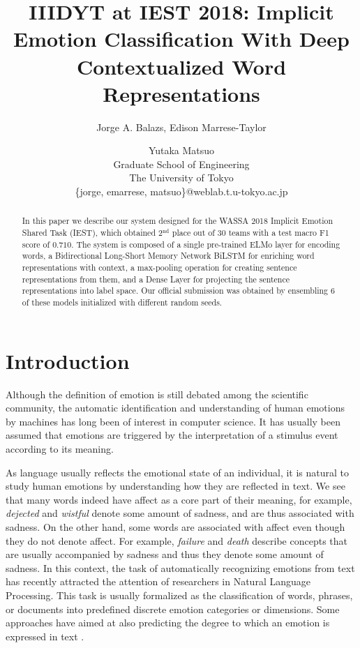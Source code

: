 \documentclass[11pt,a4paper]{article}
\title{IIIDYT at IEST 2018: Implicit Emotion Classification With Deep
Contextualized Word Representations}
\author{Jorge A. Balazs, Edison Marrese-Taylor \and Yutaka Matsuo \\
  Graduate School of Engineering\\
  The University of Tokyo\\
  \{jorge, emarrese, matsuo\}@weblab.t.u-tokyo.ac.jp \\
}
\date{}
\begin{document}
\maketitle
\begin{abstract}

In this paper we describe our system designed for the WASSA 2018 Implicit
Emotion Shared Task (IEST), which obtained 2$^{\text{nd}}$ place out of 30 teams
with a test macro F1 score of $0.710$. The system is composed of a single
pre-trained ELMo layer for encoding words, a Bidirectional Long-Short Memory
Network BiLSTM for enriching word representations with context, a max-pooling
operation for creating sentence representations from them, and a
Dense Layer for projecting the sentence representations into label space. Our
official submission was obtained by ensembling 6 of these models initialized
with different random seeds.

\end{abstract}

\section{Introduction}

Although the definition of emotion is still debated among the scientific
community, the automatic identification and understanding of human emotions by
machines has long been of interest in computer science. It has usually been
assumed that emotions are triggered by the interpretation of a stimulus event
according to its meaning. 

As language usually reflects the emotional state of an individual, it is natural
to study human emotions by understanding how they are reflected in text. We see
that many words indeed have affect as a core part of their meaning, for example,
\textit{dejected} and \textit{wistful} denote some amount of sadness, and are
thus associated with sadness. On the other hand, some words are associated with
affect even though they do not denote affect. For example, \textit{failure} and
\textit{death} describe concepts that are usually accompanied by sadness and
thus they denote some amount of sadness. In this context, the task of
automatically recognizing emotions from text has recently attracted the
attention of researchers in Natural Language Processing. This task is usually
formalized as the classification of words, phrases, or documents into predefined
discrete emotion categories or dimensions. Some approaches have aimed at also
predicting the degree to which an emotion is expressed in text
\cite{wassa_emoint_2017}.
\end{document}
